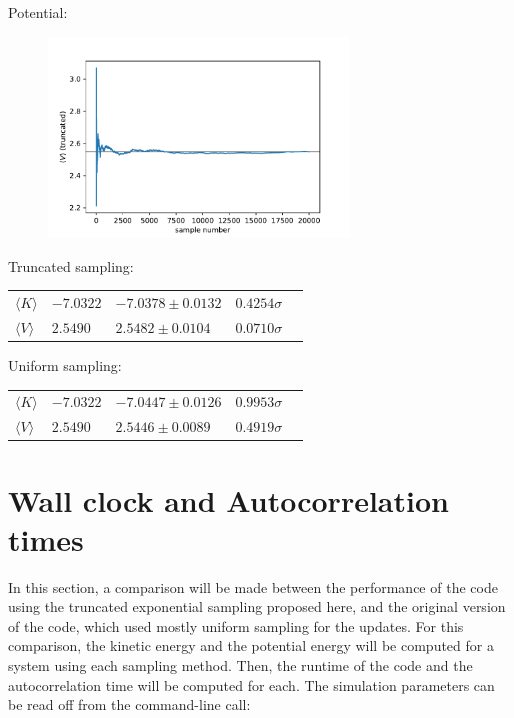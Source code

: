 \documentclass[12pt, two sided]{article}
\begin{document}
Potential:

\begin{figure}[h!]
\includegraphics[width=8cm]{../figures/runningAve_V_truncated.pdf}
\end{figure}

Truncated sampling:

\begin{table}[h!]
\begin{tabular}{lllll}
 $\langle K \rangle$ &  $-7.0322$ &  $-7.0378 \pm 0.0132$ & $0.4254\sigma$  \\
 $\langle V \rangle$ & $2.5490$ & $2.5482 \pm 0.0104$  & $0.0710\sigma$\\
\end{tabular}
\end{table}

Uniform sampling:

\begin{table}[h!]
\begin{tabular}{lllll}
 $\langle K \rangle$ &  $-7.0322$ &  $-7.0447 \pm 0.0126$ & $0.9953\sigma$  \\
 $\langle V \rangle$ & $2.5490$ & $2.5446 \pm 0.0089$  & $0.4919\sigma$\\
\end{tabular}
\end{table}


\section{Wall clock and Autocorrelation times}

In this section, a comparison will be made between the performance of the code using the truncated exponential sampling proposed here, and the original version of the code, which used mostly uniform sampling for the updates. For this comparison, the kinetic energy and the potential energy will be computed for a system using each sampling method. Then, the runtime of the code and the autocorrelation time will be computed for each. The simulation parameters can be read off from the command-line call:
\end{document}
